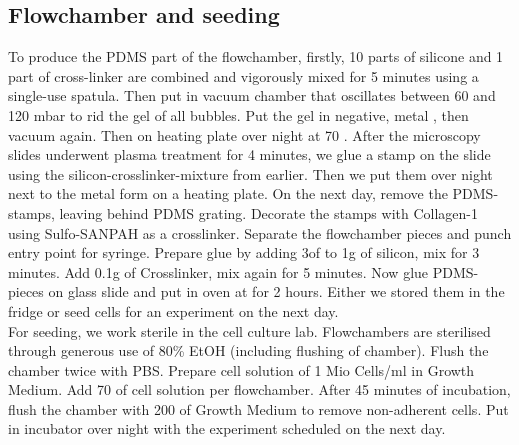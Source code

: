 \subsection{Flowchamber and seeding}
\label{sec:FluidicModel}
To produce the PDMS part of the flowchamber, firstly, 10 parts of silicone  and 1 part of cross-linker  are combined and vigorously mixed for 5 minutes using a single-use spatula. Then put in vacuum chamber that oscillates between 60 and 120 mbar to rid the gel of all bubbles. Put the gel in negative, metal , then vacuum again. Then on heating plate  over night at 70 \degC{}. After the microscopy slides underwent plasma treatment for 4 minutes, we glue a stamp on the slide using the silicon-crosslinker-mixture from earlier. Then we put them over night next to the metal form on a heating plate. On the next day, remove the PDMS-stamps, leaving behind PDMS grating. Decorate the stamps with Collagen-1  using Sulfo-SANPAH as a crosslinker. Separate the flowchamber pieces and punch entry point for syringe. Prepare glue by adding 3\mul of  to 1g of silicon, mix for 3 minutes. Add 0.1g of Crosslinker, mix again for 5 minutes. Now glue PDMS-pieces on glass slide and put in oven at  for 2 hours. Either we stored them in the fridge or seed cells for an experiment on the next day.\\
For seeding, we work sterile in the cell culture lab. Flowchambers are sterilised through generous use of 80\% EtOH (including flushing of chamber). Flush the chamber twice with PBS. Prepare cell solution of 1 Mio Cells/ml in Growth Medium. Add 70 \mul{} of cell solution per flowchamber. After 45 minutes of incubation, flush the chamber with 200\mul{} of Growth Medium to remove non-adherent cells. Put in incubator over night with the experiment scheduled on the next day.

